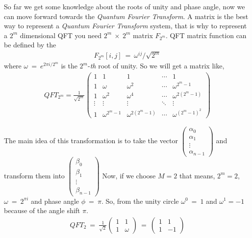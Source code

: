 \documentclass[a4paper,10pt]{article}
\begin{document}
So far we get some knowledge about the roots of unity and phase angle, now we can move forward towards the \textit{Quantum Fourier Transform}. A matrix is the best way to 
represent a \textit{Quantum Fourier Transform} system, that is why to represent a $2^m$ dimensional QFT you need $2^m\ \times\ 2^m$ matrix $F_{2^m}$. QFT matrix function 
can be defined by the 
\begin{eqnarray*}
F_{2^m}[i,j]\ =\ \omega^{ij}/\sqrt{2^m}
\end{eqnarray*}    
where $\omega\ =\ e^{2\pi i/2^m}$ is the $2^m$-\textit{th} root of unity. So we will get a matrix like,
\begin{eqnarray*}
QFT_{2^m}=\frac{1}{\sqrt{2^m}}
\begin{pmatrix}
1 & 1 & 1 & \cdots & 1 \\
1 & \omega & \omega^2 & \cdots & \omega^{2^m-1} \\
1 & \omega^2 & \omega^4 & \cdots & \omega^{2(2^m-1)} \\
\vdots & \vdots & \vdots & \ddots & \vdots \\
1 & \omega^{2^m-1} & \omega^{2(2^m-1)} &\cdots &\omega^{(2^m-1)^2}
\end{pmatrix}
\end{eqnarray*}

The main idea of this transformation is to take the vector 
$\begin{pmatrix}
  \alpha_0 \\
  \alpha_1 \\
  \vdots \\
  \alpha_{n-1} 
\end{pmatrix}
$ and transform them into 
$\begin{pmatrix}
  \beta_0 \\
  \beta_1 \\
  \vdots \\
  \beta_{n-1} 
\end{pmatrix}
$
Now, if we choose $M = 2$ that means,  $2^m = 2$, $\omega\ =\ 2^{\pi i}$ and phase angle $\phi\ =\ \pi$. So, from the unity circle $\omega^0\ =\ 1$ and $\omega^1=-1$ 
because of the angle shift $\pi$.
\begin{eqnarray*}
QFT_2\ =\ \frac{1}{\sqrt{2}}
\begin{pmatrix}
 1 & 1 \\
 1 & \omega
\end{pmatrix}
\ =\ 
\begin{pmatrix}
  1 & 1 \\
  1 & -1
\end{pmatrix}
\end{eqnarray*}
\end{document}
